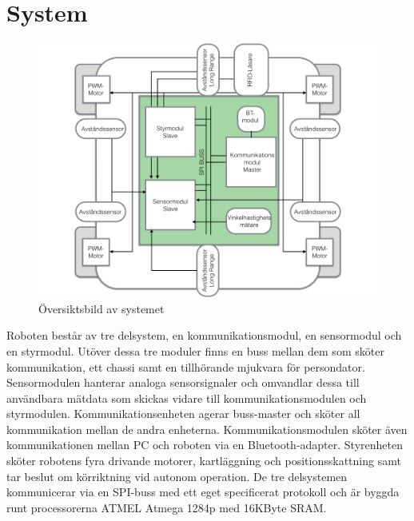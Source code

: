 \documentclass[a4paper,12pt,fleqn]{article}
\begin{document}
\newpage
\section{System}

\begin{figure}[htp] %
  \begin{center}
  \includegraphics[keepaspectratio=true,width=\linewidth]{bilder/overview}  %
  \end{center}
  \caption{Översiktsbild av systemet} %
  \label{fig:overview}
\end{figure}

Roboten består av tre delsystem, en kommunikationsmodul, en sensormodul och en styrmodul. Utöver dessa tre moduler finns en buss mellan dem som sköter kommunikation, ett chassi samt en tillhörande mjukvara för persondator. Sensormodulen hanterar analoga sensorsignaler och omvandlar dessa till användbara mätdata som skickas vidare till kommunikationsmodulen och styrmodulen. 
Kommunikationsenheten agerar buss-master och sköter all kommunikation mellan de andra enheterna. Kommunikationsmodulen sköter även kommunikationen mellan PC och roboten via en Bluetooth-adapter. Styrenheten sköter robotens fyra drivande motorer, kartläggning och positionsskattning samt tar beslut om körriktning vid autonom operation. 
De tre delsystemen kommunicerar via en SPI-buss med ett eget specificerat protokoll och är byggda runt processorerna ATMEL Atmega 1284p med 16KByte SRAM. 
\newpage
\end{document}
